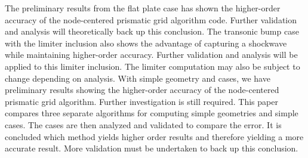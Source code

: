 The preliminary results from the flat plate case has shown the higher-order accuracy of the node-centered prismatic grid algorithm code.  Further validation and analysis will theoretically back up this conclusion.  
The transonic bump case with the limiter inclusion also shows the advantage of capturing a shockwave while maintaining higher-order accuracy.  Further validation and analysis will be applied to this limiter inclusion. The limiter computation may also be subject to change depending on analysis.  
With simple geometry and cases, we have preliminary results showing the higher-order accuracy of the node-centered prismatic grid algorithm.  Further investigation is still required.
This paper compares three separate algorithms for computing simple geometries and simple cases.  The cases are then analyzed and validated to compare the error.  It is concluded which method yields higher order results and therefore yielding a more accurate result.  More validation must be undertaken to back up this conclusion.
